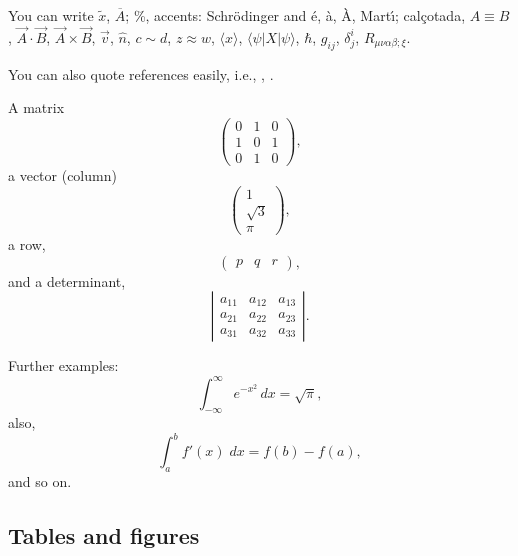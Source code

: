 \documentclass[twocolumn]{revtex4}
\begin{document}
\vspace*{0.5cm}
You can write $\tilde x$,
$\overline{A}$; \%, accents: Schr\"odinger
and \'e, \`a, \`A, Mart\'{\i}; cal\c cotada,
$A \equiv B $, $\vec{A}\cdot\vec{B}$, $\vec{A} \times \vec{B}$,
$\vec{v}$, $\hat{n}$,
$c \sim d$, $z \approx w$, $\langle x \rangle$, 
$\langle \psi | X | \psi \rangle$, $\hbar$, $g_{ij}$, $\delta^i_j$, 
$R_{\mu \nu \alpha \beta ; \xi}$.

\vspace*{0.5cm}
You can also quote references easily, i.e., \cite{wmap}, \cite{weinberg}.

\vspace*{0.5cm}
A matrix
\begin{equation}
\left(
\begin{array}{ccc}
0 & 1 & 0 \\
1 & 0 & 1 \\
0 & 1 & 0
\end{array}
\right),
\label{matrix1}
\end{equation}
a vector (column)
\begin{equation}
\left(
\begin{array}{c}
1 \\
\sqrt{3}\\
\pi
\end{array}
\right),
\label{hola}
\end{equation}
a row,
\begin{equation}
\left(
\begin{array}{ccc}
p & q & r
\end{array}
\right),
\label{eq:row}
\end{equation}
and a determinant,
\begin{equation}
\left|
\begin{array}{ccc}
a_{11} & a_{12} & a_{13} \\
a_{21} & a_{22} & a_{23} \\
a_{31} & a_{32} & a_{33}
\end{array}
\right|.
\label{determinant}
\end{equation}

\noindent
Further examples:
\begin{equation}
\int_{-\infty}^\infty e^{-x^2} \, dx= \sqrt{\pi},
\label{eq:fine}
\end{equation}
also,
\begin{equation}
\int_a^b f'(x) \; dx=f(b)-f(a),
\label{barrow}
\end{equation}
and so on.

\subsection{Tables and figures}
\end{document}
